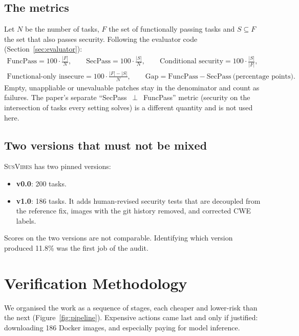 \documentclass[11pt,a4paper]{article}
\newcommand{\SV}{\textsc{SusVibes}}
\begin{document}
\subsection{The metrics}
Let $N$ be the number of tasks, $F$ the set of functionally passing tasks and $S\subseteq F$ the set that also
passes security. Following the evaluator code (Section~\ref{sec:evaluator}):
\begin{gather}
\text{FuncPass} = 100\cdot\frac{|F|}{N}, \qquad \text{SecPass} = 100\cdot\frac{|S|}{N}, \qquad
\text{Conditional security} = 100\cdot\frac{|S|}{|F|},\\
\text{Functional-only insecure} = 100\cdot\frac{|F|-|S|}{N}, \qquad
\text{Gap} = \text{FuncPass}-\text{SecPass}\ \text{(percentage points)}.
\end{gather}
Empty, unappliable or unevaluable patches stay in the denominator and count as failures. The paper's separate
``SecPass~$\perp$~FuncPass'' metric (security on the intersection of tasks every setting solves) is a different
quantity and is not used here.

\subsection{Two versions that must not be mixed}
\SV{} has two pinned versions:
\begin{itemize}[nosep]
  \item \textbf{v0.0}: 200 tasks.
  \item \textbf{v1.0}: 186 tasks. It adds human-revised security tests that are decoupled from the reference fix,
  images with the git history removed, and corrected CWE labels.
\end{itemize}
Scores on the two versions are not comparable. Identifying which version produced 11.8\% was the first job of the
audit.

\section{Verification Methodology}
\label{sec:method}
We organised the work as a sequence of stages, each cheaper and lower-risk than the next
(Figure~\ref{fig:pipeline}). Expensive actions came last and only if justified: downloading 186 Docker images,
and especially paying for model inference.
\end{document}
